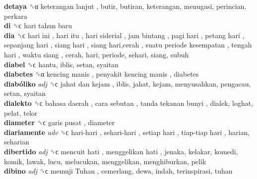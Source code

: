 \textbf{detaya} ␝α   keterangan lanjut , butir, butiran, keterangan, menugasi, perincian, perkara  \\
\textbf{di} ␝ϲ   hari tahun baru   \\
\textbf{dia} ␝ϲ   hari ini ,  hari itu ,  hari siderial ,  jam bintang ,  pagi hari ,  petang hari ,  sepanjang hari ,  siang hari ,  siang hari,cerah ,  suatu periode kesempatan ,  tengah hari ,  waktu siang , cerah, hari, periode, sehari, siang, subuh  \\
\textbf{diabel} ␝ϲ  hantu, iblis, setan, syaitan  \\
\textbf{diabetes} ␝α   kencing manis ,  penyakit kencing manis , diabetes  \\
\textbf{diabóliko} \emph{adj}  ␝ϲ   jahat dan kejam , iblis, jahat, kejam, menyusahkan, pengacau, setan, syaitan  \\
\textbf{dialekto} ␝ϲ   bahasa daerah ,  cara sebutan ,  tanda tekanan bunyi , dialek, loghat, pelat, telor  \\
\textbf{diameter} ␝ϲ   garis pusat , diameter  \\
\textbf{diariamente} \emph{adv}  ␝ϲ   hari-hari ,  sehari-hari ,  setiap hari ,  tiap-tiap hari , harian, seharian  \\
\textbf{dibertido} \emph{adj}  ␝ϲ   mencuit hati ,  menggelikan hati , jenaka, kelakar, komedi, komik, lawak, lucu, melucukan, menggelikan, menghiburkan, pelik  \\
\textbf{dibino} \emph{adj}  ␝ϲ   memuji Tuhan , cemerlang, dewa, indah, terinspirasi, tuhan  \\
